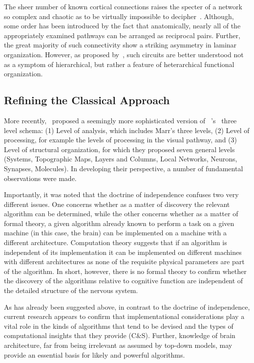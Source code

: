 \documentclass[11pt,3p,twocolumn]{JMN}
\begin{document}
The sheer number of known cortical connections raises the specter of a network so complex and chaotic as to be virtually impossible to decipher~\citep{vanessen93}. Although, some order has been introduced by the fact that anatomically, nearly all of the appropriately examined pathways can be arranged as reciprocal pairs. Further, the great majority of such connectivity show a striking asymmetry in laminar organization. However, as proposed by~\citet{mcculloch45a,mcculloch45b}, such circuits are better understood not as a symptom of hierarchical, but rather a feature of heterarchical functional organization.

\subsection{Refining the Classical Approach}

More recently,~\citet[][C\&S]{Churchland:1992uq} proposed a seemingly more sophisticated version of ~\citeauthor{Marr:1982fk}'s~\citeyear{Marr:1982fk} three level schema: (1) Level of analysis, which includes Marr’s three levels, (2) Level of processing, for example the levels of processing in the visual pathway, and (3) Level of structural organization, for which they proposed seven general levels (Systems, Topographic Maps, Layers and Columns, Local Networks, Neurons, Synapses, Molecules). In developing their perspective, a number of fundamental observations were made.

Importantly, it was noted that the doctrine of independence confuses two very different issues. One concerns whether as a matter of discovery the relevant algorithm can be determined, while the other concerns whether as a matter of formal theory, a given algorithm already known to perform a task on a given machine (in this case, the brain) can be implemented on a machine with a different architecture. Computation theory suggests that if an algorithm is independent of its implementation it can be implemented on different machines with different architectures as none of the requisite physical parameters are part of the algorithm. In short, however, there is no formal theory to confirm whether the discovery of the algorithms relative to cognitive function are independent of the detailed structure of the nervous system.

As has already been suggested above, in contrast to the doctrine of independence, current research appears to confirm that implementational considerations play a vital role in the kinds of algorithms that tend to be devised and the types of computational insights that they provide (C\&S). Further, knowledge of brain architecture, far from being irrelevant as assumed by top-down models, may provide an essential basis for likely and powerful algorithms.
\end{document}
